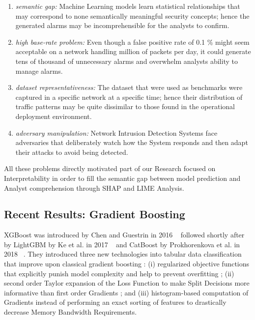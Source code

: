 \begin{enumerate}
\item \emph{semantic gap:} Machine Learning models learn statistical relationships that may correspond to none semantically meaningful security concepts; hence the generated alarms may be incomprehensible for the analysts to confirm.

\item \emph{high base-rate problem:} Even though a false positive rate of 0.1 \% might seem acceptable on a network handling million of packets per day, it could generate tens of thousand of unnecessary alarms and overwhelm analysts ability to manage alarms.

\item \emph{dataset representativeness:} The dataset that were used as benchmarks were captured in a specific network at a specific time; hence their distribution of traffic patterns may be quite dissimilar to those found in the operational deployment environment.

\item \emph{adversary manipulation:} Network Intrusion Detection Systems face adversaries that deliberately watch how the System responds and then adapt their attacks to avoid being detected.
\end{enumerate}

All these problems directly motivated part of our Research focused on Interpretability in order to fill the semantic gap between model prediction and Analyst comprehension through SHAP and LIME Analysis.

\subsection{Recent Results: Gradient Boosting }

XGBoost was introduced by Chen and Guestrin in 2016 ~\cite{xgboost} followed shortly after by LightGBM by Ke et al. in 2017 ~\cite{lightgbm} and CatBoost by Prokhorenkova et al. in 2018 ~\cite{catboost}. They introduced three new technologies into tabular data classification that improve upon classical gradient boosting : (i) regularized objective functions that explicitly punish model complexity and help to prevent overfitting ; (ii) second order Taylor expansion of the Loss Function to make Split Decisions more informative than first order Gradients ; and (iii) histogram-based computation of Gradients instead of performing an exact sorting of features to drastically decrease Memory Bandwidth Requirements.

